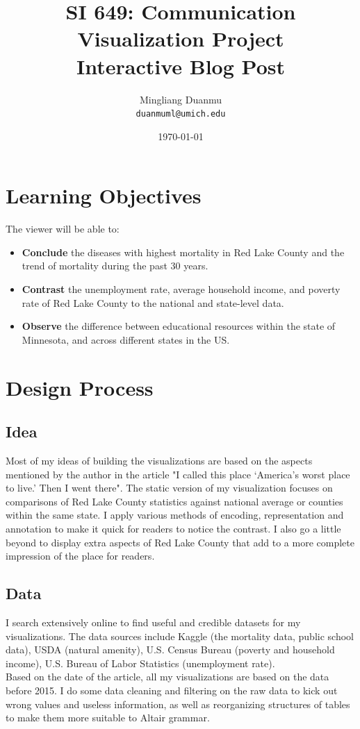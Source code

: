 \documentclass{article}
\title{SI 649: Communication Visualization Project \\ Interactive Blog Post} %
\author{Mingliang Duanmu\\ \texttt{duanmuml@umich.edu}} %
\date{\today} %
\begin{document}
\maketitle %

\section{Learning Objectives}

The viewer will be able to:
\begin{itemize}
    \item \textbf{Conclude} the diseases with highest mortality in Red Lake County and the trend of mortality during the past 30 years.
    \item \textbf{Contrast} the unemployment rate, average household income, and poverty rate of Red Lake County to the national and state-level data.
    \item \textbf{Observe} the difference between educational resources within the state of Minnesota, and across different states in the US.
\end{itemize}

\section{Design Process}

\subsection*{Idea}

Most of my ideas of building the visualizations are based on the aspects mentioned by the author in the article "I called this place ‘America’s worst place to live.’ Then I went there". The static version of my visualization focuses on comparisons of Red Lake County statistics against national average or counties within the same state. I apply various methods of encoding, representation and annotation to make it quick for readers to notice the contrast. I also go a little beyond to display extra aspects of Red Lake County that add to a more complete impression of the place for readers.

\subsection*{Data}

I search extensively online to find useful and credible datasets for my visualizations. The data sources include Kaggle (the mortality data, public school data), USDA (natural amenity), U.S. Census Bureau (poverty and household income), U.S. Bureau of Labor Statistics (unemployment rate). \\
\noindent
Based on the date of the article, all my visualizations are based on the data before 2015. I do some data cleaning and filtering on the raw data to kick out wrong values and useless information, as well as reorganizing structures of tables to make them more suitable to Altair grammar.
\end{document}
